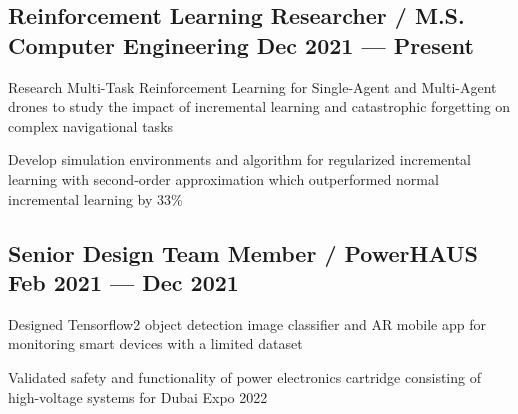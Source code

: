 \subsection{{Reinforcement Learning Researcher / M.S. Computer Engineering  \hfill Dec 2021 --- Present}}
\begin{zitemize}
	\item Research Multi-Task Reinforcement Learning for Single-Agent and Multi-Agent drones to study the impact of incremental learning and catastrophic forgetting on complex navigational tasks
	\item Develop simulation environments and algorithm for regularized incremental learning with second-order approximation which outperformed normal incremental learning by 33\%
\end{zitemize}


\subsection{{Senior Design Team Member / PowerHAUS \hfill Feb 2021 --- Dec 2021}}
\begin{zitemize}
	\item Designed Tensorflow2 object detection image classifier and AR mobile app for monitoring smart devices with a
    limited dataset
	\item Validated safety and functionality of power electronics cartridge consisting of high-voltage systems for Dubai Expo 2022
\end{zitemize}

